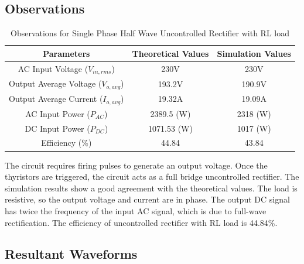 \subsection{Observations}

\begin{table}[h]
    \renewcommand{\arraystretch}{1.3}
    \label{table_observation_2}
    \centering
    \begin{tabular}{|c|c|c|}
        \hline
        Parameters                              & Theoretical Values & Simulation Values \\
        \hline
        \hline
        AC Input Voltage ($ V_{in,rms} $)       & 230V               & 230V              \\
        \hline
        Output Average Voltage ($ V_{o,avg} $)  & 193.2V             & 190.9V            \\
        \hline
        Output Average Current ($ I_{o,avg}  $) & 19.32A             & 19.09A            \\
        \hline
        AC Input Power ($ P_{AC} $)             & 2389.5 (W)         & 2318 (W)          \\
        \hline
        DC Input Power ($ P_{DC} $)             & 1071.53 (W)        & 1017 (W)          \\
        \hline
        Efficiency (\%)                         & 44.84              & 43.84             \\
        \hline
    \end{tabular}
    \caption{Observations for Single Phase Half Wave Uncontrolled Rectifier with RL load}

\end{table}


The circuit requires firing pulses to generate an output voltage. Once the thyristors are triggered, the circuit acts as a full bridge uncontrolled rectifier. The simulation results show a good agreement with the theoretical values. The load is resistive, so the output voltage and current are in phase. The output DC signal has twice the frequency of the input AC signal, which is due to full-wave rectification.
The efficiency of uncontrolled rectifier with RL load is 44.84\%.
\pagebreak


\subsection{Resultant Waveforms}

